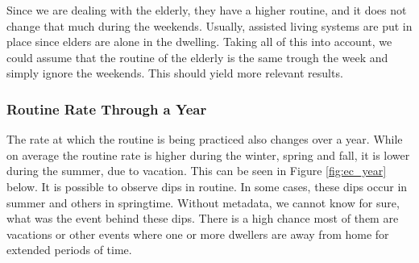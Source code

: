 Since we are dealing with the elderly, they have a higher routine, and it does not change that much during the weekends. 
Usually, assisted living systems are put in place since elders are alone in the dwelling.
Taking all of this into account, we could assume that the routine of the elderly is the same trough the week and simply ignore the weekends. 
This should yield more relevant results. 

\subsubsection{Routine Rate Through a Year}

The rate at which the routine is being practiced also changes over a year. 
While on average the routine rate is higher during the winter, spring and fall, it is lower during the summer, due to vacation. 
This can be seen in Figure \ref{fig:ec_year} below. 
It is possible to observe dips in routine. 
In some cases, these dips occur in summer and others in springtime. 
Without metadata, we cannot know for sure, what was the event behind these dips. 
There is a high chance most of them are vacations or other events where one or more dwellers are away from home for extended periods of time. 

